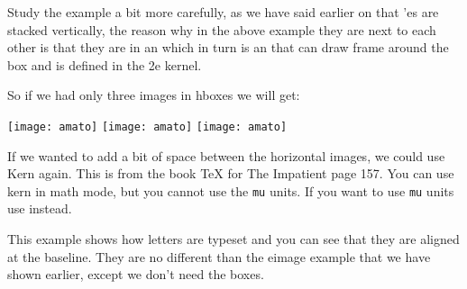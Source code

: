 Study the example a bit more carefully, as we have said earlier on that 'es are stacked vertically, the reason why in the above example they are next to each other is that they are in an
 which in turn is an   that can draw  frame around the box and is defined in the
\latex2e kernel.

So if we had only three images in hboxes we will get:

\begin{texexample}{}{}
\parindent30pt
\hbox{\texttt{[image: amato]}}%
\hbox{\texttt{[image: amato]}}%
\hbox{\texttt{[image: amato]}}%
\end{texexample}

\begin{macro}{\kern}
If we wanted to add a bit of space between the horizontal images, we could use 
Kern again. This is from the book TeX for The Impatient page 157. You can use kern in math mode, but you cannot use the \texttt{mu} units. If you want to use \texttt{mu} units use  instead.
\end{macro}

\begin{texexample}{}{}
   \fboxsep=0pt
\end{texexample}

\begin{texexample}{}{}
   \HHUGE
   \fboxsep=0pt
\end{texexample}

This example shows how letters are typeset and you can see that they are aligned at the baseline. They are no different than the eimage example that we have shown earlier, except we don't need the boxes.

\medskip

